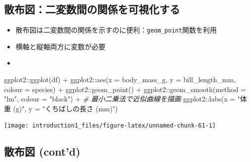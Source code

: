 \documentclass[
]{ltjsarticle}
\newenvironment{Shaded}{\begin{snugshade}}{\end{snugshade}}
\newcommand{\AttributeTok}[1]{\textcolor[rgb]{0.77,0.63,0.00}{#1}}
\newcommand{\CommentTok}[1]{\textcolor[rgb]{0.56,0.35,0.01}{\textit{#1}}}
\newcommand{\FunctionTok}[1]{\textcolor[rgb]{0.00,0.00,0.00}{#1}}
\newcommand{\NormalTok}[1]{#1}
\newcommand{\SpecialCharTok}[1]{\textcolor[rgb]{0.00,0.00,0.00}{#1}}
\newcommand{\StringTok}[1]{\textcolor[rgb]{0.31,0.60,0.02}{#1}}
\providecommand{\tightlist}{%
  \setlength{\itemsep}{0pt}\setlength{\parskip}{0pt}}
\begin{document}
\hypertarget{ux6563ux5e03ux56f3ux4e8cux5909ux6570ux9593ux306eux95a2ux4fc2ux3092ux53efux8996ux5316ux3059ux308b}{%
\subsection{散布図：二変数間の関係を可視化する}\label{ux6563ux5e03ux56f3ux4e8cux5909ux6570ux9593ux306eux95a2ux4fc2ux3092ux53efux8996ux5316ux3059ux308b}}

\begin{itemize}
\tightlist
\item
  散布図は二変数間の関係を示すのに便利：\texttt{geom\_point}関数を利用
\item
  横軸と縦軸両方に変数が必要
\item
\end{itemize}

\begin{Shaded}
\begin{Highlighting}[]
\NormalTok{ggplot2}\SpecialCharTok{::}\FunctionTok{ggplot}\NormalTok{(df) }\SpecialCharTok{+}
\NormalTok{  ggplot2}\SpecialCharTok{::}\FunctionTok{aes}\NormalTok{(}\AttributeTok{x =}\NormalTok{ body\_mass\_g, }\AttributeTok{y =}\NormalTok{ bill\_length\_mm, }\AttributeTok{colour =}\NormalTok{ species) }\SpecialCharTok{+}
\NormalTok{  ggplot2}\SpecialCharTok{::}\FunctionTok{geom\_point}\NormalTok{() }\SpecialCharTok{+}
\NormalTok{  ggplot2}\SpecialCharTok{::}\FunctionTok{geom\_smooth}\NormalTok{(}\AttributeTok{method =} \StringTok{"lm"}\NormalTok{, }\AttributeTok{colour =} \StringTok{"black"}\NormalTok{) }\SpecialCharTok{+} \CommentTok{\# 最小二乗法で近似曲線を描画}
\NormalTok{  ggplot2}\SpecialCharTok{::}\FunctionTok{labs}\NormalTok{(}\AttributeTok{x =} \StringTok{"体重 (g)"}\NormalTok{, }\AttributeTok{y =} \StringTok{"くちばしの長さ (mm)"}\NormalTok{)}
\end{Highlighting}
\end{Shaded}

\begin{center}\texttt{[image: introduction1\_files/figure-latex/unnamed-chunk-61-1]} \end{center}

\hypertarget{ux6563ux5e03ux56f3-contd}{%
\subsection{散布図 (cont'd)}\label{ux6563ux5e03ux56f3-contd}}
\end{document}
